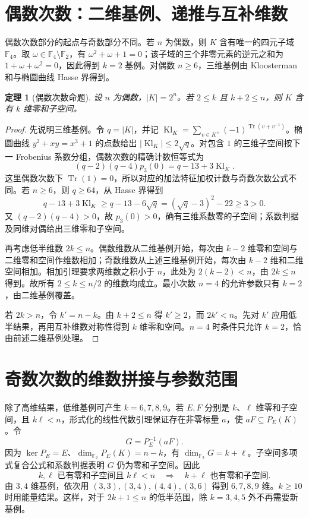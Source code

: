 \documentclass[UTF8,a4paper,11pt]{ctexart}
\numberwithin{equation}{section}
\newtheorem{theorem}{定理}[section]
\theoremstyle{definition}
\theoremstyle{remark}
\newcommand{\Ftwo}{\mathbb F_2}
\newcommand{\dimf}{\dim_{\Ftwo}}
\begin{document}
\section{偶数次数：二维基例、递推与互补维数}

偶数次数部分的起点与奇数部分不同。若 $n$ 为偶数，则 $K$ 含有唯一的四元子域 $\mathbb F_4$。取 $\omega\in\mathbb F_4\setminus\mathbb F_2$，有 $\omega^2+\omega+1=0$；该子域的三个非零元素的逆元之和为 $1+\omega+\omega^2=0$，因此得到 $k=2$ 基例。对偶数 $n\ge6$，三维基例由 Kloosterman 和与椭圆曲线 Hasse 界得到。

\begin{theorem}[偶数次数命题]\label{thm:even}
设 $n$ 为偶数，$|K|=2^n$。若 $2\le k$ 且 $k+2\le n$，则 $K$ 含有 $k$ 维零和子空间。
\end{theorem}
\begin{proof}
先说明三维基例。令 $q=|K|$，并记 $\operatorname{Kl}_K=\sum_{v\in K^\times}(-1)^{\operatorname{Tr}(v+v^{-1})}$。椭圆曲线 $y^2+xy=x^3+1$ 的点数给出 $|\operatorname{Kl}_K|\le2\sqrt q$。对包含 $1$ 的三维子空间按下一 Frobenius 系数分组，偶数次数的精确计数恒等式为
\[
 (q-2)(q-4)p_3(0)=q-13+3\operatorname{Kl}_K.
\]
这里偶数次数下 $\operatorname{Tr}(1)=0$，所以对应的加法特征加权计数与奇数次数公式不同。若 $n\ge6$，则 $q\ge64$，从 Hasse 界得到
\[
q-13+3\operatorname{Kl}_K\ge q-13-6\sqrt q=(\sqrt q-3)^2-22\ge3>0.
\]
又 $(q-2)(q-4)>0$，故 $p_3(0)>0$，确有三维系数零的子空间；系数判据及同维对偶给出三维零和子空间。

再考虑低半维数 $2k\le n$。偶数维数从二维基例开始，每次由 $k-2$ 维零和空间与二维零和空间作维数相加；奇数维数从上述三维基例开始，每次由 $k-2$ 维和二维空间相加。相加引理要求两维数之积小于 $n$，此处为 $2(k-2)<n$，由 $2k\le n$ 得到。故所有 $2\le k\le n/2$ 的维数均成立。最小次数 $n=4$ 的允许参数只有 $k=2$，由二维基例覆盖。

若 $2k>n$，令 $k'=n-k$。由 $k+2\le n$ 得 $k'\ge2$，而 $2k'<n$。先对 $k'$ 应用低半结果，再用互补维数对称性得到 $k$ 维零和空间。$n=4$ 时条件只允许 $k=2$，恰由前述二维基例处理。
\end{proof}

\section{奇数次数的维数拼接与参数范围}

除了高维结果，低维基例可产生 $k=6,7,8,9$。若 $E,F$ 分别是 $k$、$\ell$ 维零和子空间，且 $k\ell<n$，形式化的线性代数引理保证存在非零标量 $a$，使 $aF\subseteq P_E(K)$。令
\[
 G=P_E^{-1}(aF).
\]
因为 $\ker P_E=E$、$\dimf P_E(K)=n-k$，有 $\dimf G=k+\ell$。子空间多项式复合公式和系数判据表明 $G$ 仍为零和子空间。因此
\begin{equation}\label{eq:add}
 k,\ell\text{ 已有零和子空间且 }k\ell<n
 \quad\Longrightarrow\quad k+\ell\text{ 也有零和子空间}.
\end{equation}
由 $3,4$ 维基例，依次用 $(3,3),(3,4),(4,4),(3,6)$ 得到 $6,7,8,9$ 维。$k\ge10$ 时用能量结果。这样，对于 $2k+1\le n$ 的低半范围，除 $k=3,4,5$ 外不再需要新基例。
\end{document}
